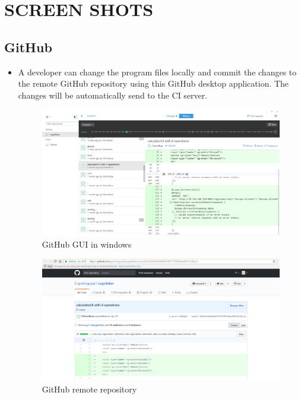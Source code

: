 \documentclass[12pt,a4paper,oneside]{report}
\begin{document}
{\section{SCREEN SHOTS}
\subsection{GitHub}
\begin{itemize}
\item \par A developer can change the program files locally and commit the changes to the remote GitHub repository using this GitHub desktop application. The changes will be automatically send to the CI server.
\begin{figure}[h]
\begin{center}
\includegraphics[scale=.47]{git.png}
\caption{GitHub GUI in windows}
\label{GitHub GUI in windows}
\end{center}
\end{figure}
\pagebreak
\begin{figure}[h]
\begin{center}
\includegraphics[scale=.47]{remote.png}
\caption{GitHub remote repository }
\label{GitHub remote repository}
\end{center}
\end{figure}
\end{itemize}
\pagebreak
\newpage
}
\end{document}
